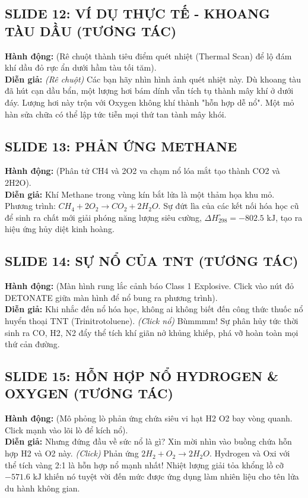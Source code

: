 \documentclass[13pt,a4paper]{article}
\begin{document}
\subsection*{SLIDE 12: VÍ DỤ THỰC TẾ - KHOANG TÀU DẦU (TƯƠNG TÁC)}
\textbf{Hành động:} (Rê chuột thành tiêu điểm quét nhiệt (Thermal Scan) để lộ đám khí dầu đỏ rực ẩn dưới hầm tàu tối tăm).\\
\textbf{Diễn giả:} \textit{(Rê chuột)} Các bạn hãy nhìn hình ảnh quét nhiệt này. Dù khoang tàu đã hút cạn dầu bẩn, một lượng hơi bám dính vẫn tích tụ thành mây khí ở dưới đáy. Lượng hơi này trộn với Oxygen không khí thành "hỗn hợp dễ nổ". Một mỏ hàn sửa chữa có thể lập tức tiễn mọi thứ tan tành mây khói.

\subsection*{SLIDE 13: PHẢN ỨNG METHANE}
\textbf{Hành động:} (Phân tử CH4 và 2O2 va chạm nổ lóa mắt tạo thành CO2 và 2H2O).\\
\textbf{Diễn giả:} Khí Methane trong vùng kín bắt lửa là một thảm họa khu mỏ. Phương trình: $CH_4 + 2O_2 \rightarrow CO_2 + 2H_2O$. Sự đứt lìa của các kết nối hóa học cũ để sinh ra chất mới giải phóng năng lượng siêu cường, $\Delta H_{298}^\circ = -802.5 \text{ kJ}$, tạo ra hiệu ứng hủy diệt kinh hoàng.

\subsection*{SLIDE 14: SỰ NỔ CỦA TNT (TƯƠNG TÁC)}
\textbf{Hành động:} (Màn hình rung lắc cảnh báo Class 1 Explosive. Click vào nút đỏ DETONATE giữa màn hình để nổ bung ra phương trình).\\
\textbf{Diễn giả:} Khi nhắc đến nổ hóa học, không ai không biết đến công thức thuốc nổ huyển thoại TNT (Trinitrotoluene). \textit{(Click nổ)} Bùmmmm! Sự phân hủy tức thời sinh ra CO, H2, N2 đẩy thể tích khí giãn nở khủng khiếp, phá vỡ hoàn toàn mọi thứ cản đường.

\subsection*{SLIDE 15: HỖN HỢP NỔ HYDROGEN \& OXYGEN (TƯƠNG TÁC)}
\textbf{Hành động:} (Mô phỏng lò phản ứng chứa siêu vi hạt H2 O2 bay vòng quanh. Click mạnh vào lõi lò để kích nổ).\\
\textbf{Diễn giả:} Nhưng đứng đầu về sức nổ là gì? Xin mời nhìn vào buồng chứa hỗn hợp H2 và O2 này. \textit{(Click)} Phản ứng $2H_2 + O_2 \rightarrow 2H_2O$. Hydrogen và Oxi với thể tích vàng 2:1 là hỗn hợp nổ mạnh nhất! Nhiệt lượng giải tỏa khổng lồ cỡ $-571.6 \text{ kJ}$ khiến nó tuyệt vời đến mức được ứng dụng làm nhiên liệu cho tên lửa du hành không gian.
\end{document}
